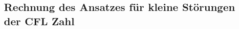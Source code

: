 \subsection{Rechnung des Ansatzes für kleine Störungen der CFL Zahl}
\label{appendix:kleineta:rechnung}
